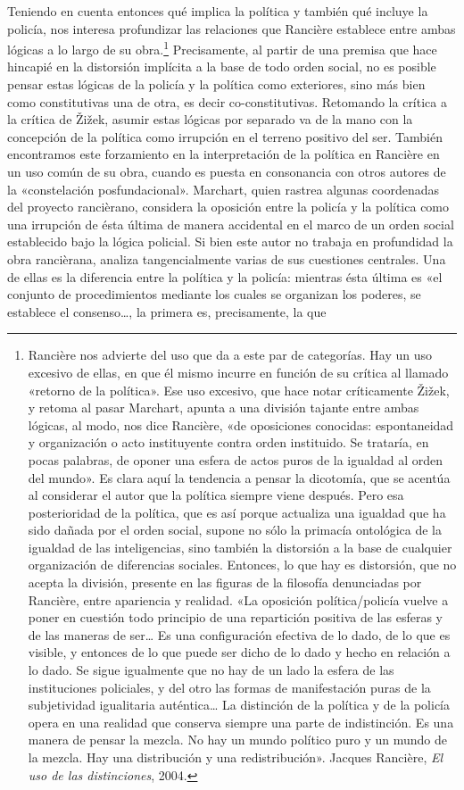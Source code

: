 Teniendo en cuenta entonces qué implica la política y también qué incluye la policía, nos interesa profundizar las relaciones que Rancière establece entre ambas lógicas a lo largo de su obra.\footnote{Rancière nos advierte del uso que da a este par de categorías. Hay un uso excesivo de ellas, en que él mismo incurre en función de su crítica al llamado «retorno de la política». Ese uso excesivo, que hace notar críticamente Žižek, y retoma al pasar Marchart, apunta a una división tajante entre ambas lógicas, al modo, nos dice Rancière, «de oposiciones conocidas: espontaneidad y organización o acto instituyente contra orden instituido. Se trataría, en pocas palabras, de oponer una esfera de actos puros de la igualdad al orden del mundo». Es clara aquí la tendencia a pensar la dicotomía, que se acentúa al considerar el autor que la política siempre viene después. Pero esa posterioridad de la política, que es así porque actualiza una igualdad que ha sido dañada por el orden social, supone no sólo la primacía ontológica de la igualdad de las inteligencias, sino también la distorsión a la base de cualquier organización de diferencias sociales. Entonces, lo que hay es distorsión, que no acepta la división, presente en las figuras de la filosofía denunciadas por Rancière, entre apariencia y realidad. «La oposición política/policía vuelve a poner en cuestión todo principio de una repartición positiva de las esferas y de las maneras de ser\ldots{} Es una configuración efectiva de lo dado, de lo que es visible, y entonces de lo que puede ser dicho de lo dado y hecho en relación a lo dado. Se sigue igualmente que no hay de un lado la esfera de las instituciones policiales, y del otro las formas de manifestación puras de la subjetividad igualitaria auténtica\ldots{} La distinción de la política y de la policía opera en una realidad que conserva siempre una parte de indistinción. Es una manera de pensar la mezcla. No hay un mundo político puro y un mundo de la mezcla. Hay una distribución y una redistribución». Jacques Rancière, \emph{El uso de las distinciones}, 2004.} Precisamente, al partir de una premisa que hace hincapié en la distorsión implícita a la base de todo orden social, no es posible pensar estas lógicas de la policía y la política como exteriores, sino más bien como constitutivas una de otra, es decir co-constitutivas. Retomando la crítica a la crítica de Žižek, asumir estas lógicas por separado va de la mano con la concepción de la política como irrupción en el terreno positivo del ser. También encontramos este forzamiento en la interpretación de la política en Rancière en un uso común de su obra, cuando es puesta en consonancia con otros autores de la «constelación posfundacional». Marchart, quien rastrea algunas coordenadas del proyecto rancièrano, considera la oposición entre la policía y la política como una irrupción de ésta última de manera accidental en el marco de un orden social establecido bajo la lógica policial. Si bien este autor no trabaja en profundidad la obra rancièrana, analiza tangencialmente varias de sus cuestiones centrales. Una de ellas es la diferencia entre la política y la policía: mientras ésta última es «el conjunto de procedimientos mediante los cuales se organizan los poderes, se establece el consenso\ldots, la primera es, precisamente, la que 